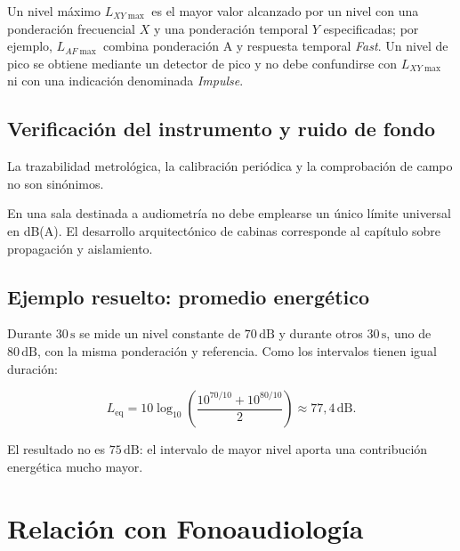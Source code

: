 Un nivel máximo \(L_{XY\max}\) es el mayor valor alcanzado por un nivel con una
ponderación frecuencial \(X\) y una ponderación temporal \(Y\) especificadas;
por ejemplo, \(L_{AF\max}\) combina ponderación A y respuesta temporal
\emph{Fast}. Un nivel de pico se obtiene mediante un detector de pico y no
debe confundirse con \(L_{XY\max}\) ni con una indicación denominada
\emph{Impulse}.

\subsection{Verificación del instrumento y ruido de fondo}
\label{sec:u5-verificacion-sonometro}

La trazabilidad metrológica, la calibración periódica y la comprobación de
campo no son sinónimos. 

En una sala destinada a audiometría no debe emplearse un único límite universal
en dB(A).  El desarrollo arquitectónico de
cabinas corresponde al capítulo sobre propagación y aislamiento.

\subsection{Ejemplo resuelto: promedio energético}
\label{sec:u5-ejemplo-leq}

Durante \(30\,\text{s}\) se mide un nivel constante de \(70\,\text{dB}\) y
durante otros \(30\,\text{s}\), uno de \(80\,\text{dB}\), con la misma
ponderación y referencia. Como los intervalos tienen igual duración:

\[
    L_\mathrm{eq}
    =10\log_{10}
    \left(
        \frac{10^{70/10}+10^{80/10}}{2}
    \right)
    \approx77{,}4\,\text{dB}.
\]

El resultado no es \(75\,\text{dB}\): el intervalo de mayor nivel aporta una
contribución energética mucho mayor.

\section{Relación con Fonoaudiología}
\label{sec:u5-relacion-fonoaudiologia}

